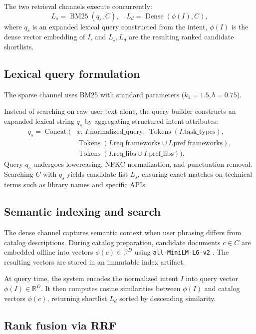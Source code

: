 The two retrieval channels execute concurrently:
\[
L_s = \operatorname{BM25}(q_s, C), \quad L_d = \operatorname{Dense}(\phi(I), C),
\]
where $q_s$ is an expanded lexical query constructed from the intent, $\phi(I)$ is the dense vector embedding of $I$, and $L_s, L_d$ are the resulting ranked candidate shortlists.

\subsection{Lexical query formulation}

The sparse channel uses BM25 \cite{bm25} with standard parameters ($k_1 = 1.5, b = 0.75$). 

Instead of searching on raw user text alone, the query builder constructs an expanded lexical string $q_s$ by aggregating structured intent attributes:
\[
\begin{aligned}
q_s = \operatorname{Concat}\Big( & x, \, I.\mathrm{normalized\_query}, \, \operatorname{Tokens}(I.\mathrm{task\_types}), \\
& \operatorname{Tokens}(I.\mathrm{req\_frameworks} \cup I.\mathrm{pref\_frameworks}), \\
& \operatorname{Tokens}(I.\mathrm{req\_libs} \cup I.\mathrm{pref\_libs})\Big).
\end{aligned}
\]
Query $q_s$ undergoes lowercasing, NFKC normalization, and punctuation removal. Searching $C$ with $q_s$ yields candidate list $L_s$, ensuring exact matches on technical terms such as library names and specific APIs.

\subsection{Semantic indexing and search}

The dense channel captures semantic context when user phrasing differs from catalog descriptions. During catalog preparation, candidate documents $c \in C$ are embedded offline into vectors $\phi(c) \in \mathbb{R}^D$ using \texttt{all-MiniLM-L6-v2} \cite{sentencebert}. The resulting vectors are stored in an immutable index artifact.

At query time, the system encodes the normalized intent $I$ into query vector $\phi(I) \in \mathbb{R}^D$. It then computes cosine similarities between $\phi(I)$ and catalog vectors $\phi(c)$, returning shortlist $L_d$ sorted by descending similarity.

\subsection{Rank fusion via RRF}

